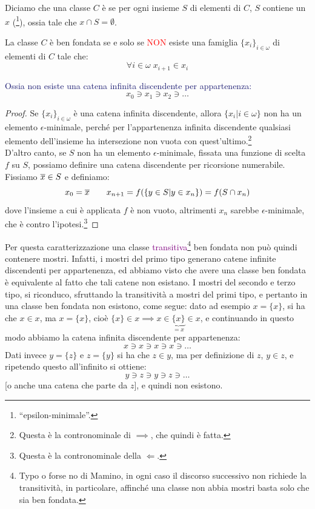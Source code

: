 \begin{definition}
	Diciamo che una classe $C$ è  se per ogni insieme $S$ di elementi di $C$, $S$ contiene un $x$  (\footnote{\;``epsilon-minimale''.}),
	ossia tale che $x \cap S = \emptyset$.
\end{definition}

\begin{proposition}
	La classe $C$ è ben fondata se e solo se \textcolor{red}{NON} esiste una famiglia $\{x_i\}_{i \in \omega}$ di elementi di $C$ tale che:
	\[ \forall i \in \omega \; x_{i+1}\in x_i
		\]
\end{proposition}

\textcolor{MidnightBlue}{Ossia non esiste una catena infinita discendente per appartenenza:}
\[ x_0 \ni x_1 \ni x_2 \ni \ldots
	\]

\begin{proof}
	Se $\{x_i\}_{i \in \omega}$ è una catena infinita discendente, allora $\{x_i | i \in \omega\}$ non ha un elemento $\epsilon$-minimale, perché per l'appartenenza infinita discendente qualsiasi elemento dell'insieme ha intersezione non vuota con quest'ultimo.\footnote{Questa è la contronominale di $\implies$, che quindi è fatta.}\\
	D'altro canto, se $S$ non ha un elemento $\epsilon$-minimale, fissata una funzione di scelta $f$ su $S$, possiamo definire una catena discendente per ricorsione numerabile. Fissiamo $\overline x \in S$ e definiamo:
	\[ x_0 = \overline x \qquad x_{n+1} = f(\{y \in S | y \in x_n\}) = f(S \cap x_n)
		\]
	dove l'insieme a cui è applicata $f$ è non vuoto, altrimenti $x_n$ sarebbe $\epsilon$-minimale, che è contro l'ipotesi.\footnote{Questa è la contronominale della $\Longleftarrow$.}
\end{proof}

Per questa caratterizzazione una classe \textcolor{purple}{transitiva}\footnote{Typo o forse no di Mamino, in ogni caso il discorso successivo non richiede la transitività, in particolare, affinché una classe non abbia mostri basta solo che sia ben fondata.} ben fondata non può quindi contenere mostri. Infatti, i mostri del primo tipo generano catene infinite discendenti per appartenenza, ed abbiamo visto che avere una classe ben fondata è equivalente al fatto che tali catene non esistano.
I mostri del secondo e terzo tipo, si riconduco, sfruttando la transitività a mostri del primi tipo, e pertanto in una classe ben fondata non esistono, come segue: dato ad esempio $x = \{x\}$, si ha che $x \in x$, ma $x = \{x\}$, cioè $\{x\} \in x \implies x \in \underbrace{\{x\}}_{= x} \in x$, e continuando in questo modo abbiamo la catena infinita discendente per appartenenza:
\[ x \ni x \ni x \ni x \ni \ldots
	\]
Dati invece $y = \{z\}$ e $z = \{y\}$ si ha che $z \in y$, ma per definizione di $z$, $y \in z$, e ripetendo questo all'infinito si ottiene:
\[  y \ni z \ni y \ni z \ni \ldots
	\]
[o anche una catena che parte da $z$], e quindi non esistono.

